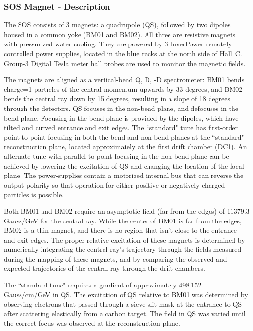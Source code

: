 \subsubsection{SOS Magnet - Description}

The SOS consists of 3 magnets: a quadrupole (QS), followed by two dipoles housed
in a common yoke (BM01 and BM02). All three are resistive magnets
with pressurized water cooling. They are powered by 3
InverPower remotely controlled power supplies, located in the blue racks at
the north side of Hall~C. Group-3 Digital Tesla meter hall probes
are used to monitor the magnetic fields.

The magnets are aligned as a vertical-bend Q, D, -D spectrometer: BM01 bends
charge=1 particles of the central momentum upwards by 33 degrees, and BM02 bends
the central ray down by 15 degrees, resulting in a slope of 18 degrees through
the detectors. QS focuses in the non-bend plane, and defocuses in the bend
plane. Focusing in the bend plane is provided by the dipoles, which have tilted
and curved entrance and exit edges. The ``standard" tune has first-order
point-to-point focusing in both the bend and non-bend planes at the ``standard"
reconstruction plane, located approximately at the first drift chamber (DC1).
An alternate tune with parallel-to-point focusing in the non-bend plane can be
achieved by lowering the excitation of QS and changing the location of the
focal plane. The power-supplies contain a motorized internal bus that can 
reverse
the output polarity so that operation for either positive or negatively charged
particles is possible.

Both BM01 and BM02 require an asymptotic field (far from the edges) of 11379.3
Gauss/GeV for the central ray. While the center of BM01 is far from the edges,
BM02 is a thin magnet, and there is no region that isn't close to the entrance
and exit edges. The proper relative excitation of these magnets is determined
by numerically integrating the central ray's trajectory through the fields
measured during the mapping of these magnets, and by comparing the observed and
expected trajectories of the central ray through the drift chambers.

The ``standard tune" requires a gradient of approximately 498.152 Gauss/cm/GeV
in QS. The excitation of QS relative to BM01 was determined by observing
electrons that passed through a sieve-slit mask at the entrance to QS after
scattering elastically from a carbon target. The field in QS was varied until
the correct focus was observed at the reconstruction plane.


